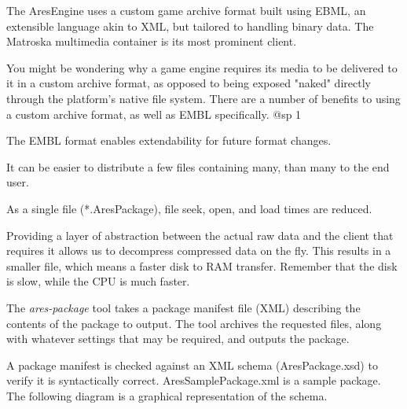 

The AresEngine uses a custom game archive format built using EBML, an extensible language akin to XML, but tailored to handling binary data. The Matroska multimedia container is its most prominent client.

You might be wondering why a game engine requires its media to be delivered to it in a custom archive format, as opposed to being exposed "naked" directly through the platform's native file system. There are a number of benefits to using a custom archive format, as well as EMBL specifically.
@sp 1

\startitemize
\item
The EMBL format enables extendability for future format changes.

\item
It can be easier to distribute a few files containing many, than many to the end user.

\item
As a single file (*.AresPackage), file seek, open, and load times are reduced.

\item
Providing a layer of abstraction between the actual raw data and the client that requires it allows us to decompress compressed data on the fly. This results in a smaller file, which means a faster disk to RAM transfer. Remember that the disk is slow, while the CPU is much faster.
\stopitemize

The {\sl ares-package} tool takes a package manifest file (XML) describing the contents of the package to output. The tool archives the requested files, along with whatever settings that may be required, and outputs the package.

A package manifest is checked against an XML schema (AresPackage.xsd) to verify it is syntactically correct. AresSamplePackage.xml is a sample package. The following diagram is a graphical representation of the schema.
\page
{}
    {}

